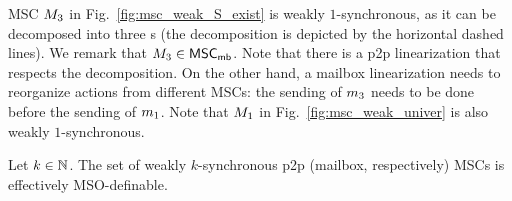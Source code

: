 \documentclass{article}
\begin{document}
\noindent \begin{minipage}[c]{10.5cm}
\begin{example}
MSC $M_{3}$ in Fig.~\ref{fig:msc_weak_S_exist} is weakly $1$-synchronous, as it can be
decomposed  into three s (the decomposition is depicted by the
horizontal dashed lines). We remark that $M_{3} \in
\mathsf{MSC}_{\mathsf{mb}}$. Note that there is a p2p linearization that respects the decomposition.
On the other hand, a mailbox linearization needs to reorganize actions from different MSCs: the sending of
$m_3$ needs to be done before the sending of $m_1$. Note that $M_{1}$ in
Fig.~\ref{fig:msc_weak_univer} is also weakly $1$-synchronous.
\end{example}
\end{minipage}
\hfill
\begin{minipage}[c]{3cm}
\begin{center}

\label{fig:msc_weak_S_exist}

\end{center}
\end{minipage}

\medskip


\begin{proposition}
	\label{prop:weak-logic-bounded}
	Let $k \in \mathbb{N}$. The set of weakly $k$-synchronous p2p (mailbox, respectively) MSCs
	is effectively MSO-definable.
\end{proposition}
\end{document}
